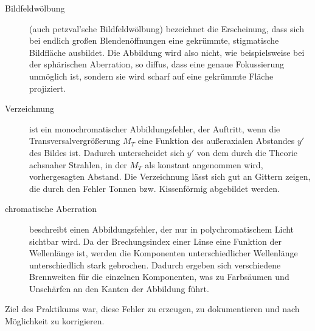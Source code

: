 \begin{description}
	\item[Bildfeldwölbung] (auch petzval'sche Bildfeldwölbung) bezeichnet die Erscheinung, dass sich bei endlich großen Blendenöffnungen eine gekrümmte, stigmatische Bildfläche ausbildet. Die Abbildung wird also nicht, wie beispielsweise bei der sphärischen Aberration, so diffus, dass eine genaue Fokussierung unmöglich ist, sondern sie wird scharf auf eine gekrümmte Fläche projiziert. \cite[432ff.]{hecht2014optik}
	\item[Verzeichnung] ist ein monochromatischer Abbildungsfehler, der Auftritt, wenn die Transversalvergrößerung $M_T$ eine Funktion des außeraxialen Abstandes $y'$ des Bildes ist. Dadurch unterscheidet sich $y'$ von dem durch die Theorie achsnaher Strahlen, in der $M_T$ als konstant angenommen wird, vorhergesagten Abstand. Die Verzeichnung lässt sich gut an Gittern zeigen, die durch den Fehler Tonnen bzw. Kissenförmig abgebildet werden. \cite[435ff.]{hecht2014optik}
	\item[chromatische Aberration] beschreibt einen Abbildungsfehler, der nur in polychromatischem Licht sichtbar wird. Da der Brechungsindex einer Linse eine Funktion der Wellenlänge ist, werden die Komponenten unterschiedlicher Wellenlänge unterschiedlich stark gebrochen. Dadurch ergeben sich verschiedene Brennweiten für die einzelnen Komponenten, was zu Farbsäumen und Unschärfen an den Kanten der Abbildung führt. \cite[438ff.]{hecht2014optik}
\end{description}

Ziel des Praktikums war, diese Fehler zu erzeugen, zu dokumentieren und nach Möglichkeit zu korrigieren.
